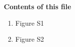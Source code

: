 \documentclass[draft,jgrga]{agutexSI2019}
\begin{document}
\begin{article}

%
%



\noindent\textbf{Contents of this file}
\begin{enumerate}
\item Figure S1 
\item Figure S2
\end{enumerate}



%



\end{article}
\end{document}
